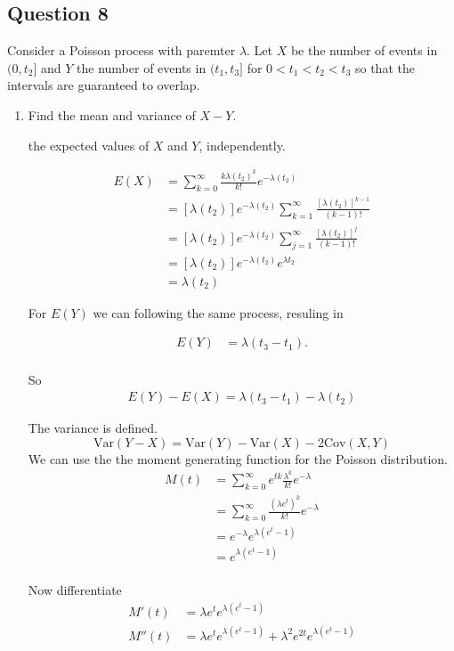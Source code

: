 \documentclass{tufte-book}
\newcommand{\Var}{\mathrm{Var}}
\newcommand{\Cov}{\mathrm{Cov}}
\theoremstyle{mytheoremstyle}
\theoremstyle{mylemstyle}
\theoremstyle{mydefstyle}
\begin{document}
\subsection{Question 8}
Consider a Poisson process with paremter $\lambda$.  Let $X$ be the number of events in $(0,t_2]$ and $Y$ the number of events in $(t_1,t_3]$ for $0<t_1<t_2<t_3$ so that the intervals are guaranteed to overlap.

\begin{enumerate}
\item Find the mean and variance of $X-Y$.

 the expected values of $X$ and $Y$, independently.

\begin{align*}
E(X)&= \sum_{k=0}^\infty \frac{k\lambda(t_2)^k}{k!}e^{-\lambda(t_2)}\\
&= [\lambda(t_2)]e^{-\lambda(t_2)} \sum_{k=1}^\infty\frac{[\lambda(t_2)]^{k-1}}{(k-1)!}\\
&=[\lambda(t_2)]e^{-\lambda(t_2)} \sum_{j=1}^\infty\frac{[\lambda(t_2)]^{j}}{(k-1)!}\\
&=[\lambda(t_2)]e^{-\lambda(t_2)}e^{\lambda t_2}\\
&= \lambda(t_2)
\end{align*}

For $E(Y)$ we can following the same process, resuling in

\begin{align*}
E(Y) &= \lambda(t_3-t_1).\\
\end{align*}

So
\begin{align*}E(Y)-E(X)=\lambda(t_3-t_1)-\lambda(t_2)
\end{align*}

The variance is defined.
\[ \Var(Y-X) = \Var(Y)-\Var(X)-2\Cov(X,Y) \]
We can use the the moment generating function for the Poisson distribution.
\begin{align*}
M(t) &= \sum_{k=0}^\infty e^{tk}\frac{\lambda^k}{k!}e^{-\lambda}\\
&= \sum_{k=0}^\infty \frac{(\lambda e^t)^k}{k!}e^{-\lambda}\\
&= e^{-\lambda}e^{\lambda(e^{t}-1)}\\
&= e^{\lambda(e^t-1)}\\
\end{align*}

Now differentiate
\begin{align*}
M'(t)&=\lambda e^te^{\lambda(e^t-1)}\\
M''(t)&= \lambda e^te^{\lambda(e^t-1)} + \lambda^2e^{2t}e^{\lambda(e^t-1)}\\
\end{align*}


\end{enumerate}
\end{document}
